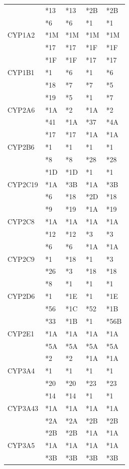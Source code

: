 \documentclass{report}
\begin{document}
\begin{tabularx}{\textwidth}{ X | XXXX }
& *13 & *13 & *2B & *2B  \\
& *6 & *6 & *1 & *1 \\
\midrule
CYP1A2
& *1M & *1M & *1M & *1M \\
& *17 & *17 & *1F & *1F  \\
& *1F & *1F & *17 & *17 \\
\midrule
CYP1B1
& *1 & *6 & *1 & *6 \\
& *18 & *7 & *7 & *5  \\
& *19 & *5 & *1 & *7 \\
\midrule
CYP2A6
& *1A & *2 & *1A & *2 \\
& *41 & *1A & *37 & *4A  \\
& *17 & *17 & *1A & *1A \\
\midrule
CYP2B6
& *1 & *1 & *1 & *1 \\
& *8 & *8 & *28 & *28  \\
& *1D & *1D & *1 & *1 \\
\midrule
CYP2C19
& *1A & *3B & *1A & *3B \\
& *6 & *18 & *2D & *18  \\
& *9 & *19 & *1A & *19 \\
\midrule
CYP2C8
& *1A & *1A & *1A & *1A \\
& *12 & *12 & *3 & *3  \\
& *6 & *6 & *1A & *1A \\
\midrule
CYP2C9
& *1 & *18 & *1 & *3 \\
& *26 & *3 & *18 & *18  \\
& *8 & *1 & *1 & *1 \\
\midrule
CYP2D6
& *1 & *1E & *1 & *1E \\
& *56 & *1C & *52 & *1B  \\
& *33 & *1B & *1 & *56B \\
\midrule
CYP2E1
& *1A & *1A & *1A & *1A \\
& *5A & *5A & *5A & *5A  \\
& *2 & *2 & *1A & *1A \\
\midrule
CYP3A4
& *1 & *1 & *1 & *1 \\
& *20 & *20 & *23 & *23  \\
& *14 & *14 & *1 & *1 \\
\midrule
CYP3A43
& *1A & *1A & *1A & *1A \\
& *2A & *2A & *2B & *2B  \\
& *2B & *2B & *1A & *1A \\
\midrule
CYP3A5
& *1A & *1A & *1A & *1A \\
& *3B & *3B & *3B & *3B  \\

\end{tabularx}
\end{document}
